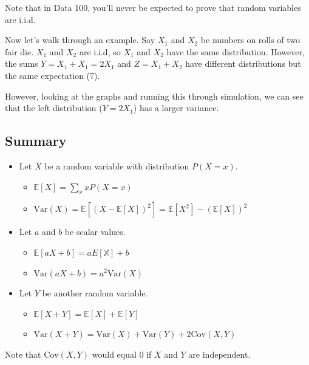 \documentclass[
  letterpaper,
  DIV=11,
  numbers=noendperiod]{scrreprt}
\providecommand{\tightlist}{%
  \setlength{\itemsep}{0pt}\setlength{\parskip}{0pt}}\usepackage{longtable,booktabs,array}
\begin{document}
Note that in Data 100, you'll never be expected to prove that random
variables are i.i.d.

Now let's walk through an example. Say \(X_1\) and \(X_2\) be numbers on
rolls of two fair die. \(X_1\) and \(X_2\) are i.i.d, so \(X_1\) and
\(X_2\) have the same distribution. However, the sums
\(Y = X_1 + X_1 = 2X_1\) and \(Z=X_1+X_2\) have different distributions
but the same expectation (7).

However, looking at the graphs and running this through simulation, we
can see that the left distribution (\(Y = 2X_1\)) has a larger variance.

\subsection{Summary}\label{summary-2}

\begin{itemize}
\tightlist
\item
  Let \(X\) be a random variable with distribution \(P(X=x)\).

  \begin{itemize}
  \tightlist
  \item
    \(\mathbb{E}[X] = \sum_{x} x P(X=x)\)
  \item
    \(\text{Var}(X) = \mathbb{E}[(X-\mathbb{E}[X])^2] = \mathbb{E}[X^2] - (\mathbb{E}[X])^2\)
  \end{itemize}
\item
  Let \(a\) and \(b\) be scalar values.

  \begin{itemize}
  \tightlist
  \item
    \(\mathbb{E}[aX+b] = aE[\mathbb{X}] + b\)
  \item
    \(\text{Var}(aX+b) = a^2 \text{Var}(X)\)
  \end{itemize}
\item
  Let \(Y\) be another random variable.

  \begin{itemize}
  \tightlist
  \item
    \(\mathbb{E}[X+Y] = \mathbb{E}[X] + \mathbb{E}[Y]\)
  \item
    \(\text{Var}(X + Y) = \text{Var}(X) + \text{Var}(Y) + 2\text{Cov}(X,Y)\)
  \end{itemize}
\end{itemize}

Note that \(\text{Cov}(X,Y)\) would equal 0 if \(X\) and \(Y\) are
independent.
\end{document}
